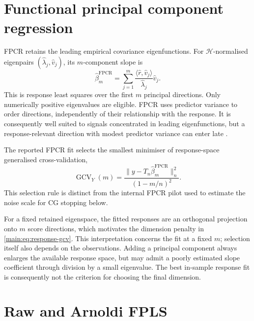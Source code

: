 \section{Functional principal component regression}

FPCR retains the leading empirical covariance eigenfunctions. For
$\mathcal H$-normalised eigenpairs
$(\widehat\lambda_j,\widehat v_j)$, its $m$-component slope is
\begin{equation}
 \widehat\beta_m^{\mathrm{FPCR}}
 =\sum_{j=1}^{m}
 \frac{\langle\widehat r,\widehat v_j\rangle}
      {\widehat\lambda_j}\widehat v_j.
 \label{main:eq:fpcr}
\end{equation}
This is response least squares over the first $m$ principal directions.
Only numerically positive eigenvalues are eligible. FPCR uses predictor
variance to order directions, independently of their relationship with the
response. It is consequently well suited to signals concentrated in leading
eigenfunctions, but a response-relevant direction with modest predictor
variance can enter late \parencite{cardot_ferraty_sarda_1999}.

The reported FPCR fit selects the smallest minimiser of response-space
generalised cross-validation,
\begin{equation}
 \operatorname{GCV}_{Y}(m)
 =\frac{\|y-T_n\widehat\beta_m^{\mathrm{FPCR}}\|_n^2}
             {(1-m/n)^2}.
 \label{main:eq:response-gcv}
\end{equation}
This selection rule is distinct from the internal FPCR pilot used to
estimate the noise scale for CG stopping below.

For a fixed retained eigenspace, the fitted responses are an orthogonal
projection onto $m$ score directions, which motivates the dimension
penalty in \eqref{main:eq:response-gcv}. This interpretation concerns the
fit at a fixed $m$; selection itself also depends on the observations.
Adding a principal component always enlarges the available response
space, but may admit a poorly estimated slope coefficient through division
by a small eigenvalue. The best in-sample response fit is consequently not
the criterion for choosing the final dimension.

\section{Raw and Arnoldi FPLS}

